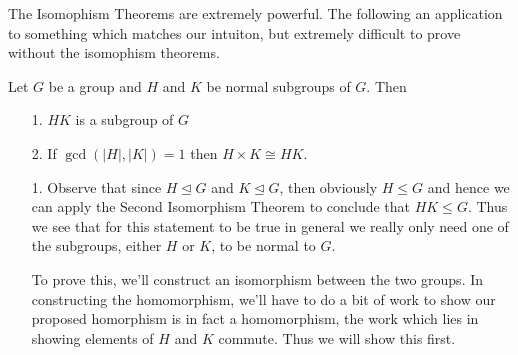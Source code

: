 \documentclass[12pt,letterpaper]{algebra_book}
\theoremstyle{definition}
\begin{document}
    
    The Isomophism Theorems are extremely powerful. The following
    an application to something which matches our intuiton, but
    extremely difficult to prove without the isomophism theorems.    
    \begin{thm}\label{product_theorem}
        Let $G$ be a group and $H$ and $K$ be normal subgroups of $G$.
        Then 
        \begin{itemize}
            \item[1.] $HK$ is a subgroup of $G$ 
            \item[2.] If $\gcd(|H|, |K|) = 1$ then $H \times K \cong
            HK$. 
        \end{itemize}
    \end{thm}

    \begin{prf}
        \begin{itemize}
            \item[1.] Observe that since $H \unlhd G$ and $K \unlhd G$, then obviously 
            $H \le G$ and hence we can apply the Second Isomorphism Theorem to conclude 
            that $HK \le G$. Thus we see that for this statement to be true in general 
            we really only need one of the subgroups, either $H$ or $K$, to be normal 
            to $G$.

            \textcolor{NavyBlue}{To prove this, we'll construct an
            isomorphism between the two groups. In constructing the
            homomorphism, we'll have to do a bit of work to show our
            proposed homorphism is in fact a homomorphism, the work
            which lies in showing elements of $H$ and $K$ commute.
            Thus we will show this first.}


\end{itemize}
\end{prf}
\end{document}
